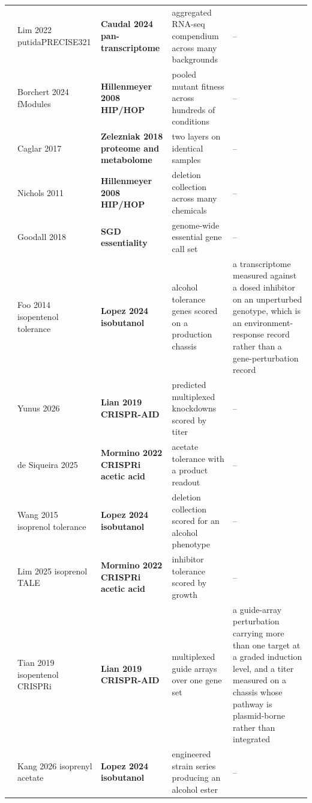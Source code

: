 \begin{landscape}
\begin{longtable}{@{}r@{\hspace{4pt}} L{40mm} L{40mm} L{74mm} L{74mm}@{}}
 & Lim 2022 putidaPRECISE321  & \textbf{Caudal 2024 pan-transcriptome} & aggregated RNA-seq compendium across many backgrounds & -- \\
 & Borchert 2024 fModules  & \textbf{Hillenmeyer 2008 HIP/HOP} & pooled mutant fitness across hundreds of conditions & -- \\
 & Caglar 2017  & \textbf{Zelezniak 2018 proteome and metabolome} & two layers on identical samples & -- \\
 & Nichols 2011  & \textbf{Hillenmeyer 2008 HIP/HOP} & deletion collection across many chemicals & -- \\
 & Goodall 2018  & \textbf{SGD essentiality} & genome-wide essential gene call set & -- \\
 & Foo 2014 isopentenol tolerance  & \textbf{Lopez 2024 isobutanol} & alcohol tolerance genes scored on a production chassis & a transcriptome measured against a dosed inhibitor on an unperturbed genotype, which is an environment-response record rather than a gene-perturbation record \\
 & Yunus 2026  & \textbf{Lian 2019 CRISPR-AID} & predicted multiplexed knockdowns scored by titer & -- \\
 & de Siqueira 2025  & \textbf{Mormino 2022 CRISPRi acetic acid} & acetate tolerance with a product readout & -- \\
 & Wang 2015 isoprenol tolerance  & \textbf{Lopez 2024 isobutanol} & deletion collection scored for an alcohol phenotype & -- \\
 & Lim 2025 isoprenol TALE  & \textbf{Mormino 2022 CRISPRi acetic acid} & inhibitor tolerance scored by growth & -- \\
 & Tian 2019 isopentenol CRISPRi  & \textbf{Lian 2019 CRISPR-AID} & multiplexed guide arrays over one gene set & a guide-array perturbation carrying more than one target at a graded induction level, and a titer measured on a chassis whose pathway is plasmid-borne rather than integrated \\
 & Kang 2026 isoprenyl acetate  & \textbf{Lopez 2024 isobutanol} & engineered strain series producing an alcohol ester & -- \\

\end{longtable}
\end{landscape}
